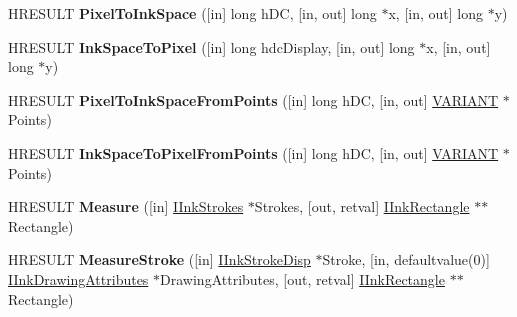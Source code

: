 \begin{DoxyCompactItemize}
\item 
\mbox{\label{interface_m_s_i_n_k_a_u_t_lib_1_1_i_ink_renderer_a2fdfd3cc6a65ecd6813e969d707d9c3e}} 
H\+R\+E\+S\+U\+LT {\bfseries Pixel\+To\+Ink\+Space} (\mbox{[}in\mbox{]} long h\+DC, \mbox{[}in, out\mbox{]} long $\ast$x, \mbox{[}in, out\mbox{]} long $\ast$y)
\item 
\mbox{\label{interface_m_s_i_n_k_a_u_t_lib_1_1_i_ink_renderer_a4798a6291b7ba048cd76e3c11c2ce18d}} 
H\+R\+E\+S\+U\+LT {\bfseries Ink\+Space\+To\+Pixel} (\mbox{[}in\mbox{]} long hdc\+Display, \mbox{[}in, out\mbox{]} long $\ast$x, \mbox{[}in, out\mbox{]} long $\ast$y)
\item 
\mbox{\label{interface_m_s_i_n_k_a_u_t_lib_1_1_i_ink_renderer_a2c9294c6f6e633ec9527fb97cb29c65c}} 
H\+R\+E\+S\+U\+LT {\bfseries Pixel\+To\+Ink\+Space\+From\+Points} (\mbox{[}in\mbox{]} long h\+DC, \mbox{[}in, out\mbox{]} \hyperlink{structtag_v_a_r_i_a_n_t}{V\+A\+R\+I\+A\+NT} $\ast$Points)
\item 
\mbox{\label{interface_m_s_i_n_k_a_u_t_lib_1_1_i_ink_renderer_a263ab85ba5025c04661037cc8072de6c}} 
H\+R\+E\+S\+U\+LT {\bfseries Ink\+Space\+To\+Pixel\+From\+Points} (\mbox{[}in\mbox{]} long h\+DC, \mbox{[}in, out\mbox{]} \hyperlink{structtag_v_a_r_i_a_n_t}{V\+A\+R\+I\+A\+NT} $\ast$Points)
\item 
\mbox{\label{interface_m_s_i_n_k_a_u_t_lib_1_1_i_ink_renderer_a1dda14faadd9b9eee5c6fa4cf15c6d8d}} 
H\+R\+E\+S\+U\+LT {\bfseries Measure} (\mbox{[}in\mbox{]} \hyperlink{interface_m_s_i_n_k_a_u_t_lib_1_1_i_ink_strokes}{I\+Ink\+Strokes} $\ast$Strokes, \mbox{[}out, retval\mbox{]} \hyperlink{interface_m_s_i_n_k_a_u_t_lib_1_1_i_ink_rectangle}{I\+Ink\+Rectangle} $\ast$$\ast$Rectangle)
\item 
\mbox{\label{interface_m_s_i_n_k_a_u_t_lib_1_1_i_ink_renderer_a88080b06a2370fd36f1ec76b46a6bcb1}} 
H\+R\+E\+S\+U\+LT {\bfseries Measure\+Stroke} (\mbox{[}in\mbox{]} \hyperlink{interface_m_s_i_n_k_a_u_t_lib_1_1_i_ink_stroke_disp}{I\+Ink\+Stroke\+Disp} $\ast$Stroke, \mbox{[}in, defaultvalue(0)\mbox{]} \hyperlink{interface_m_s_i_n_k_a_u_t_lib_1_1_i_ink_drawing_attributes}{I\+Ink\+Drawing\+Attributes} $\ast$Drawing\+Attributes, \mbox{[}out, retval\mbox{]} \hyperlink{interface_m_s_i_n_k_a_u_t_lib_1_1_i_ink_rectangle}{I\+Ink\+Rectangle} $\ast$$\ast$Rectangle)

\end{DoxyCompactItemize}
